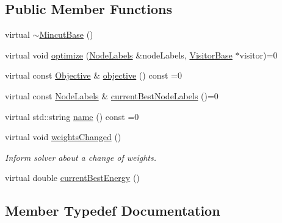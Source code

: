 \subsection*{Public Member Functions}
\begin{DoxyCompactItemize}
\item 
virtual \hyperlink{classnifty_1_1graph_1_1MincutBase_af627bd54c3d83a1212f7f3b75235023e}{$\sim$\+Mincut\+Base} ()
\item 
virtual void \hyperlink{classnifty_1_1graph_1_1MincutBase_a3ee8953dfffb3616184c8a2a769eb00e}{optimize} (\hyperlink{classnifty_1_1graph_1_1MincutBase_a9dc6555e37d38de23f194f87ca1497d5}{Node\+Labels} \&node\+Labels, \hyperlink{classnifty_1_1graph_1_1MincutBase_a5ba378dc5a1fc073eb9449ca635e7648}{Visitor\+Base} $\ast$visitor)=0
\item 
virtual const \hyperlink{classnifty_1_1graph_1_1MincutBase_afac19d146202da5a1d3a4aa4b89ea1fc}{Objective} \& \hyperlink{classnifty_1_1graph_1_1MincutBase_a543cba6f641588db66e71dfa51244381}{objective} () const  =0
\item 
virtual const \hyperlink{classnifty_1_1graph_1_1MincutBase_a9dc6555e37d38de23f194f87ca1497d5}{Node\+Labels} \& \hyperlink{classnifty_1_1graph_1_1MincutBase_aac90e879013a2a8dc615299f4c39debf}{current\+Best\+Node\+Labels} ()=0
\item 
virtual std\+::string \hyperlink{classnifty_1_1graph_1_1MincutBase_ae6c9a5996d7d17db461b1ff17f2353ab}{name} () const  =0
\item 
virtual void \hyperlink{classnifty_1_1graph_1_1MincutBase_ab9fcebb8fd780fbe7492ec7e8d1dc2d4}{weights\+Changed} ()
\begin{DoxyCompactList}\small\item\em Inform solver about a change of weights. \end{DoxyCompactList}\item 
virtual double \hyperlink{classnifty_1_1graph_1_1MincutBase_ac98f00bf23d09c2154f91d5e598958d5}{current\+Best\+Energy} ()
\end{DoxyCompactItemize}


\subsection{Member Typedef Documentation}
\hypertarget{classnifty_1_1graph_1_1MincutBase_a79320522726432c6f7e2f2b2c632683e}{}
